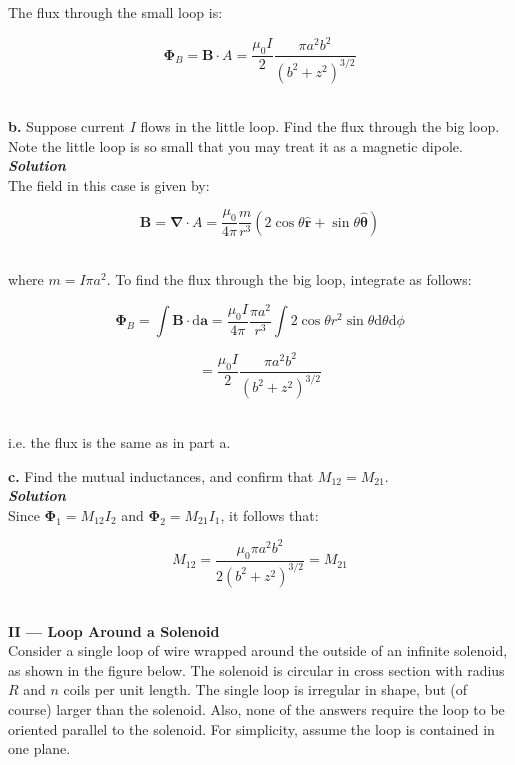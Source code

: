 \documentclass[9pt]{extarticle}
\renewcommand{\v}[1]{{\bm #1}}
\newcommand{\hv}[1]{\hat{\bm{#1}}}
\newcommand{\bfit}[1]{\textbf{\textit{#1}}}
\renewcommand{\d}{\text{d}}
\renewcommand{\div}{\boldsymbol \nabla \cdot}
\newcommand{\muo}{\mu_0}
\begin{document}
\begin{multicols*}{2}
The flux through the small loop is:

$$\v \Phi_B = \v B \cdot A = \frac{\muo I}{2} \frac{\pi a^2 b^2}{(b^2+z^2)^{3/2}}$$ \ 





\dotfill 

\hfill 

{\Large \bf b.} Suppose current $I$ flows in the little loop. Find the flux through the big loop. Note the little loop is so small that you may treat it as a magnetic dipole. \\ 

{\bfit{Solution}} \\ 

The field in this case is given by:

$$\v B = \div A = \frac{\muo}{4\pi} \frac{m}{r^3} (2\cos\theta \hv r + \sin\theta \hv \theta)$$ \ 

where $m = I\pi a^2$. To find the flux through the big loop, integrate as follows:

$$\v \Phi_B =  \int \v B \cdot \d \v a = \frac{\muo I}{4\pi} \frac{\pi a^2}{r^3} \int 2\cos\theta r^2\sin\theta \d \theta \d \phi$$  

$$= \frac{\muo I}{2} \frac{\pi a^2 b^2}{(b^2+z^2)^{3/2}}$$ \ 

i.e. the flux is the same as in part a. \\ 





\dotfill 

\hfill 

{\Large \bf c.} Find the mutual inductances, and confirm that $M_{12} = M_{21}$. \\  

{\bfit{Solution}} \\ 

Since $\v \Phi_1 = M_{12} I_2$ and $\v \Phi_2 = M_{21} I_1$, it follows that:

$$M_{12} = \frac{\muo \pi a^2 b^2}{2(b^2+z^2)^{3/2}} = M_{21}$$ \ 




\hrulefill 

\columnbreak 

{\LARGE \bf II --- Loop Around a Solenoid} \\ 

Consider a single loop of wire wrapped around the outside of an infinite solenoid, as shown in the figure below. The solenoid is circular in cross section with radius $R$ and $n$ coils per unit length. The single loop is irregular in shape, but (of course) larger than the  solenoid.  Also, none of the  answers require the  loop to be oriented parallel  to the solenoid. For simplicity, assume the loop is contained in one plane. 


\end{multicols*}
\end{document}
